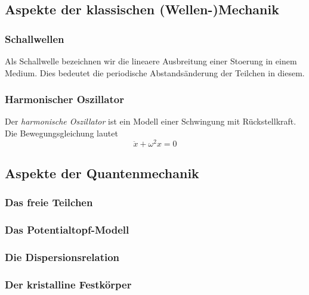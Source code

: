 \documentclass[../main.tex]{subfiles}
\begin{document}
    \subsection{Aspekte der klassischen (Wellen-)Mechanik}
        \subsubsection{Schallwellen}
            Als Schallwelle bezeichnen wir die lineaere Ausbreitung einer Stoerung in einem Medium. Dies bedeutet die periodische Abstandsänderung der Teilchen in diesem. 

        \subsubsection{Harmonischer Oszillator}
            Der \emph{harmonische Oszillator} ist ein Modell einer Schwingung mit Rückstellkraft. Die Bewegungsgleichung lautet
            \begin{equation}
                \ddot{x} + \omega^2 x = 0
            \end{equation}



    \subsection{Aspekte der Quantenmechanik}
        \subsubsection{Das freie Teilchen}


        \subsubsection{Das Potentialtopf-Modell}

        \subsubsection*{Die Dispersionsrelation}


        \subsubsection{Der kristalline Festkörper}
\end{document}
